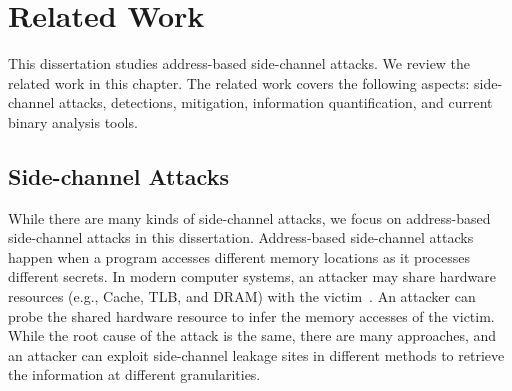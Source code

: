 
\chapter{Related Work}\label{chapter2}
This dissertation studies address-based side-channel attacks. We review the related work in this chapter. The related work covers the following aspects: side-channel attacks, detections, mitigation, information quantification, and current binary analysis tools.

\section{Side-channel Attacks}
While there are many kinds of side-channel attacks, we focus on address-based side-channel attacks in this dissertation.
Address-based side-channel attacks happen when a program accesses different memory locations as it processes different secrets. In modern computer systems, an attacker may share hardware resources (e.g., Cache, TLB, and DRAM) with the victim~\cite{ge2018survey,szefer2019survey}. An attacker can probe the shared hardware resource to infer the memory accesses of the victim. While the root cause of the attack is the same, there are many approaches, and an attacker can exploit side-channel leakage sites in different methods to retrieve the information at different granularities.

